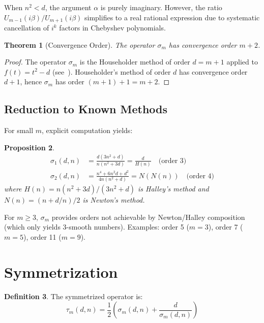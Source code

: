 \documentclass[11pt]{article}
\newtheorem{theorem}{Theorem}
\newtheorem{proposition}[theorem]{Proposition}
\theoremstyle{definition}
\newtheorem{definition}[theorem]{Definition}
\theoremstyle{remark}
\begin{document}
When $n^2 < d$, the argument $\alpha$ is purely imaginary. However, the ratio
$U_{m-1}(i\beta)/U_{m+1}(i\beta)$ simplifies to a real rational expression
due to systematic cancellation of $i^k$ factors in Chebyshev polynomials.

\begin{theorem}[Convergence Order]
The operator $\sigma_m$ has convergence order $m+2$.
\end{theorem}

\begin{proof}
The operator $\sigma_m$ is the Householder method of order $d = m+1$ applied to
$f(t) = t^2 - d$ (see~\cite{householder,dijoux}). Householder's method of order
$d$ has convergence order $d+1$, hence $\sigma_m$ has order $(m+1)+1 = m+2$.
\end{proof}

\subsection{Reduction to Known Methods}

For small $m$, explicit computation yields:

\begin{proposition}
\begin{align}
\sigma_1(d, n) &= \frac{d(3n^2 + d)}{n(n^2 + 3d)} = \frac{d}{H(n)} \quad \text{(order 3)} \\
\sigma_2(d, n) &= \frac{n^4 + 6n^2d + d^2}{4n(n^2 + d)} = N(N(n)) \quad \text{(order 4)}
\end{align}
where $H(n) = n(n^2+3d)/(3n^2+d)$ is Halley's method and $N(n) = (n+d/n)/2$
is Newton's method.
\end{proposition}

For $m \geq 3$, $\sigma_m$ provides orders not achievable by Newton/Halley
composition (which only yields 3-smooth numbers). Examples: order 5 ($m=3$),
order 7 ($m=5$), order 11 ($m=9$).

\section{Symmetrization}

\begin{definition}
The symmetrized operator is:
\begin{equation}
\tau_m(d, n) = \frac{1}{2}\left(\sigma_m(d,n) + \frac{d}{\sigma_m(d,n)}\right)
\end{equation}
\end{definition}
\end{document}
